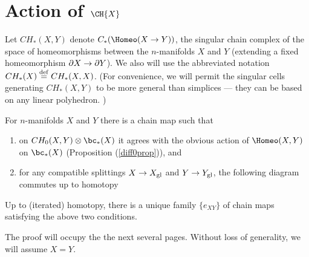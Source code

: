 
\section{Action of \texorpdfstring{$\CH{X}$}{$C_*(Homeo(M))$}}
\label{sec:evaluation}


Let $CH_*(X, Y)$ denote $C_*(\Homeo(X \to Y))$, the singular chain complex of
the space of homeomorphisms
between the $n$-manifolds $X$ and $Y$ (extending a fixed homeomorphism $\partial X \to \partial Y$).
We also will use the abbreviated notation $CH_*(X) \stackrel{\mathrm{def}}{=} CH_*(X, X)$.
(For convenience, we will permit the singular cells generating $CH_*(X, Y)$ to be more general
than simplices --- they can be based on any linear polyhedron.
)

\begin{prop}  \label{CHprop}
For $n$-manifolds $X$ and $Y$ there is a chain map
such that
\begin{enumerate}
\item on $CH_0(X, Y) \otimes \bc_*(X)$ it agrees with the obvious action of 
$\Homeo(X, Y)$ on $\bc_*(X)$ (Proposition (\ref{diff0prop})), and
\item for any compatible splittings $X\to X_\mathrm{gl}$ and $Y\to Y_\mathrm{gl}$, 
the following diagram commutes up to homotopy
\end{enumerate}
Up to (iterated) homotopy, there is a unique family $\{e_{XY}\}$ of chain maps
satisfying the above two conditions.
\end{prop}


\medskip

The proof will occupy the the next several pages.
Without loss of generality, we will assume $X = Y$.

\medskip

